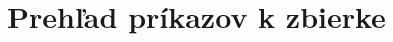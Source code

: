 \thispagestyle{empty}
\chapter{Prehľad príkazov k zbierke}
\renewcommand*{\thepage}{D-\arabic{page}}

